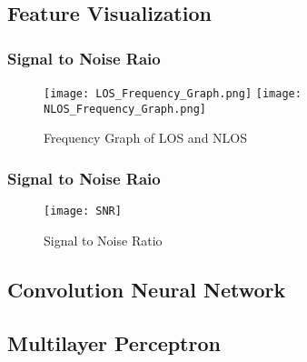 \documentclass[
	a4paper, %
	11pt, %
]{CSUniSchoolLabReport}
\begin{document}
\subsection{Feature Visualization}\label{feature_visualization}

\subsubsection{Signal to Noise Raio}\label{snr}

\begin{figure}[H] 
	\centering
	\texttt{[image: LOS\_Frequency\_Graph.png]}
	\texttt{[image: NLOS\_Frequency\_Graph.png]}
	\caption{Frequency Graph of LOS and NLOS}\label{fig:frequency_graph}
\end{figure}

\subsubsection{Signal to Noise Raio}\label{snr}

\begin{figure}[H] %
	\centering %
	\texttt{[image: SNR]} %
	\caption{Signal to Noise Ratio}\label{fig:snr}
\end{figure}


\subsection{Convolution Neural Network}\label{cnn_visual}

\subsection{Multilayer Perceptron}\label{mlp_visual}


\end{document}

